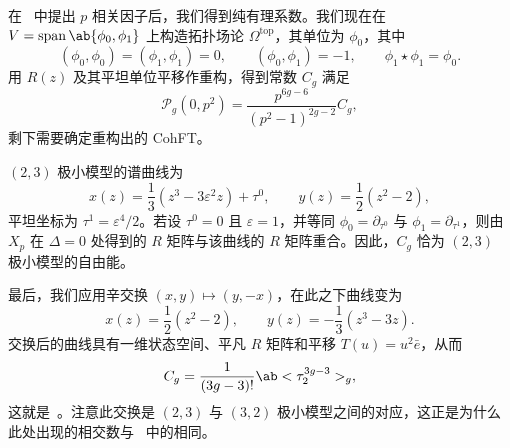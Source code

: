 \documentclass{amsart}
\theoremstyle{definition}
\theoremstyle{remark}
\theoremstyle{plain}
\theoremstyle{definition}
\theoremstyle{remark}
\newcommand{\ep}{\varepsilon}
\newcommand{\mc}[1]{\mathcal{#1}}
\newcommand{\mr}[1]{\mathrm{#1}}
\newcommand{\on}[1]{\operatorname{#1}}
\newcommand{\1}{\mathbf{1}}
\newcommand{\2}{\mathbf{2}}
\newcommand{\3}{\mathbf{3}}
\begin{document}
在~ 中提出 \(p\) 相关因子后，我们得到纯有理系数。我们现在在 \(V = \on{span}\ab\{\phi_0,\phi_1\}\) 上构造拓扑场论 \(\Omega^{\mr{top}}\)，其单位为 \(\phi_0\)，其中
\[ (\phi_0,\phi_0) = (\phi_1,\phi_1) = 0, \qquad (\phi_0,\phi_1) = -1, \qquad \phi_1 \star \phi_1 = \phi_0. \]
用 \(R(z)\) 及其平坦单位平移作重构，得到常数 \(C_g\) 满足
\[ \mc{P}_g(0,p^2) = \frac{p^{6g-6}}{(p^2-1)^{2g-2}}C_g, \]
剩下需要确定重构出的 CohFT。

\((2,3)\) 极小模型的谱曲线为
\[ x(z) = \frac{1}{3}(z^3-3\ep^2 z) + \tau^0, \qquad y(z) = \frac{1}{2}(z^2-2), \]
平坦坐标为 \(\tau^1 = \ep^4/2\)。若设 \(\tau^0 = 0\) 且 \(\ep = 1\)，并等同 \(\phi_0 = \partial_{\tau^0}\) 与 \(\phi_1 = \partial_{\tau^1}\)，则由 \(X_p\) 在 \(\Delta = 0\) 处得到的 \(R\) 矩阵与该曲线的 \(R\) 矩阵重合。因此，\(C_g\) 恰为 \((2,3)\) 极小模型的自由能。

最后，我们应用辛交换 \((x,y) \mapsto (y,-x)\)，在此之下曲线变为
\[ x(z) = \frac{1}{2}(z^2-2), \qquad y(z) = -\frac{1}{3}(z^3-3z). \]
交换后的曲线具有一维状态空间、平凡 \(R\) 矩阵和平移 \(T(u) = u^2 \bar{e}\)，从而
\[ C_g = \frac{1}{(3g-3)!}\ab<\tau_2^{3g-3}>_g, \]
这就是~。注意此交换是 \((2,3)\) 与 \((3,2)\) 极小模型之间的对应，这正是为什么此处出现的相交数与~ 中的相同。

\printbibliography
\end{document}
